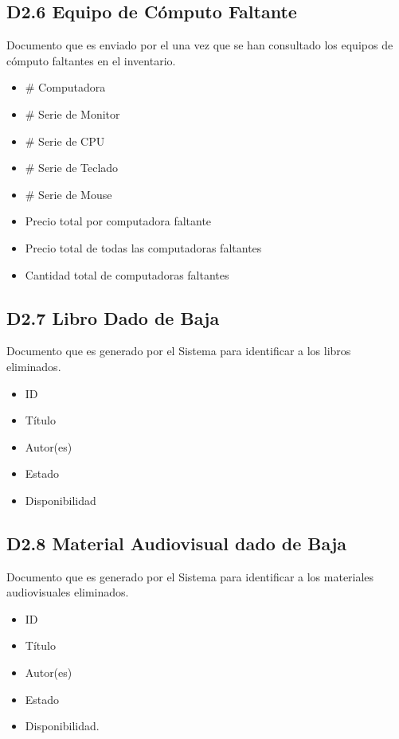   \subsection{D2.6 Equipo de Cómputo Faltante}

  Documento que es enviado por el  una vez que se han consultado los equipos de cómputo faltantes en el inventario. 
  
  \begin{itemize}
  \item \# Computadora
  \item \# Serie de Monitor
  \item \# Serie de CPU
  \item \# Serie de Teclado
  \item \# Serie de Mouse
  \item Precio total por computadora faltante
  \item Precio total de todas las computadoras faltantes
  \item Cantidad total de computadoras faltantes
  \end{itemize}
  
  \subsection{D2.7 Libro Dado de Baja}

  Documento que es generado por el Sistema para identificar a los libros eliminados.
  
  \begin{itemize}
  \item ID
  \item Título
  \item Autor(es)
  \item Estado
  \item Disponibilidad
  \end{itemize}
  
  \subsection{D2.8 Material Audiovisual dado de Baja}

  Documento que es generado por el Sistema para identificar a los materiales audiovisuales eliminados.
  
  \begin{itemize}
  \item ID
  \item Título
  \item Autor(es)
  \item Estado
  \item Disponibilidad.
  \end{itemize}
  

